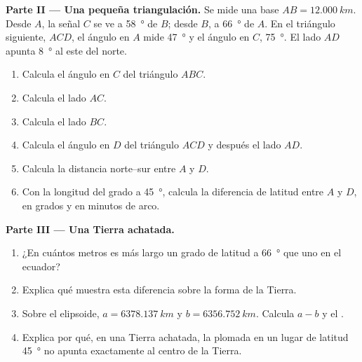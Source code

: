 \begin{problem}
\medskip
\noindent\textbf{Parte II --- Una pequeña triangulación.}
Se mide una base $AB = \qty{12.000}{km}$. Desde $A$, la señal $C$ se ve a
\qty{58}{\degree} de $B$; desde $B$, a \qty{66}{\degree} de $A$. En el
triángulo siguiente, $ACD$, el ángulo en $A$ mide \qty{47}{\degree} y el
ángulo en $C$, \qty{75}{\degree}. El lado $AD$ apunta \qty{8}{\degree} al
este del norte.
\begin{enumerate}[resume]
  \item Calcula el ángulo en $C$ del triángulo $ABC$.
  \item Calcula el lado $AC$.
  \item Calcula el lado $BC$.
  \item Calcula el ángulo en $D$ del triángulo $ACD$ y después el lado $AD$.
  \item Calcula la distancia norte--sur entre $A$ y $D$.
  \item Con la longitud del grado a \qty{45}{\degree}, calcula la diferencia
        de latitud entre $A$ y $D$, en grados y en minutos de arco.
\end{enumerate}

\medskip
\noindent\textbf{Parte III --- Una Tierra achatada.}
\begin{enumerate}[resume]
  \item ¿En cuántos metros es más largo un grado de latitud a
        \qty{66}{\degree} que uno en el ecuador?
  \item Explica qué muestra esta diferencia sobre la forma de la Tierra.
  \item Sobre el elipsoide, $a = \qty{6378.137}{km}$ y
        $b = \qty{6356.752}{km}$. Calcula $a - b$ y el .
  \item Explica por qué, en una Tierra achatada, la plomada en un lugar de
        latitud \qty{45}{\degree} no apunta exactamente al centro de la
        Tierra.
\end{enumerate}


\end{problem}

